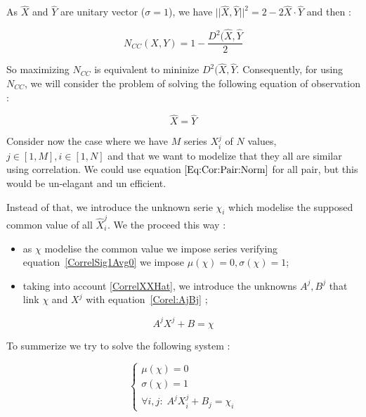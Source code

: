 As $\widehat {X}$ and $\widehat {Y}$ are unitary vector ($\sigma = 1$), we have
$||\widehat {X} ,\widehat {Y}||^2  = 2 - 2 \widehat {X} \cdot \widehat {Y} $ and then :


\begin{equation}
    N_{CC}(X,Y) = 1-\frac{ D^2(\widehat {X} ,\widehat {Y}}{2}
\end{equation}

So maximizing $N_{CC}$ is equivalent to mininize $ D^2(\widehat {X} ,\widehat {Y}$. Consequently,
for using  $N_{CC}$, we will consider the problem of  solving the following equation of observation :

\begin{equation}
    \widehat {X} =\widehat {Y} \label{Eq:Cor:Pair:Norm}
\end{equation}

Consider now the case where we have $M$ series $X^j_i$ of $N$ values, $j \in [1,M], i \in [1,N]$
and that we want to modelize that they all are similar using correlation. We could use
equation $\ref{Eq:Cor:Pair:Norm}$ for all pair, but this would be un-elagant and un efficient.

Instead of that, we introduce the unknown serie $\chi_i$ which modelise the supposed common value
of all $\widehat X^j_i$. We the proceed this way :

\begin{itemize}
    \item as $\chi$ modelise the common value we impose series verifying equation~\ref{CorrelSig1Avg0}
          we impose $\mu(\chi)=0, \sigma(\chi)=1$;
    \item taking into account \ref{CorrelXXHat},  we introduce the unknowns $A^j,B^j$
          that link $\chi$ and $X^j$ with equation~\ref{Corel:AjBj} ;
\end{itemize}

\begin{equation}
	A^j X^j + B = \chi \label{Corel:AjBj}
\end{equation}

To summerize we try to solve the following system :

\begin{equation}
\left\{ \begin{array}{rc|l}
     \mu(\chi) = 0         \\ 
     \sigma(\chi) = 1         \\ 
      \forall i,j : \;  A^j X^j_i + B_j = \chi _i
\end{array}\right.
\label{XXXXX}
\end{equation}



